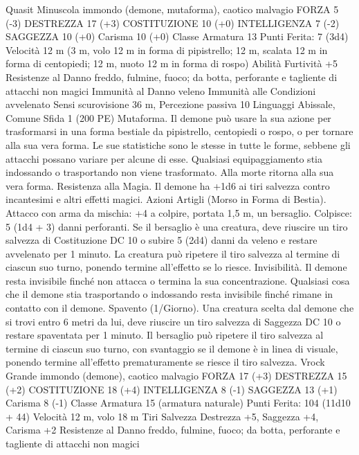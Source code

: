 \begin{multicols}{2}
Quasit
Minuscola immondo (demone, mutaforma), caotico malvagio
FORZA 5 (-3)
DESTREZZA 17 (+3)
COSTITUZIONE 10 (+0)
INTELLIGENZA 7 (-2)
SAGGEZZA 10 (+0)
Carisma 10 (+0)
Classe Armatura 13
\hspace*{0pt}\hfill{Punti Ferita}: 7 (3d4)
Velocità 12 m (3 m, volo 12 m in forma di pipistrello; 12 m,
scalata 12 m in forma di centopiedi; 12 m, nuoto 12 m in forma
di rospo)
Abilità Furtività +5
Resistenze al Danno freddo, fulmine, fuoco; da botta,
perforante e tagliente di attacchi non magici
Immunità al Danno veleno
Immunità alle Condizioni avvelenato
Sensi scurovisione 36 m, Percezione passiva 10
Linguaggi Abissale, Comune
Sfida 1 (200 PE)
Mutaforma. Il demone può usare la sua azione per trasformarsi
in una forma bestiale da pipistrello, centopiedi o rospo, o per
tornare alla sua vera forma. Le sue statistiche sono le stesse in
tutte le forme, sebbene gli attacchi possano variare per alcune di
esse. Qualsiasi equipaggiamento stia indossando o trasportando
non viene trasformato. Alla morte ritorna alla sua vera forma.
Resistenza alla Magia. Il demone ha +1d6 ai tiri salvezza
contro incantesimi e altri effetti magici.
Azioni
Artigli (Morso in Forma di Bestia). Attacco con arma da
mischia: +4 a colpire, portata 1,5 m, un bersaglio.
Colpisce: 5 (1d4 + 3) danni perforanti. Se il bersaglio è una
creatura, deve riuscire un tiro salvezza di Costituzione DC 10 o
subire 5 (2d4) danni da veleno e restare avvelenato per 1 minuto.
La creatura può ripetere il tiro salvezza al termine di ciascun suo
turno, ponendo termine all’effetto se lo riesce.
Invisibilità. Il demone resta invisibile finché non attacca o
termina la sua concentrazione. Qualsiasi cosa che il demone stia
trasportando o indossando resta invisibile finché rimane in
contatto con il demone.
Spavento (1/Giorno). Una creatura scelta dal demone che si trovi
entro 6 metri da lui, deve riuscire un tiro salvezza di Saggezza
DC 10 o restare spaventata per 1 minuto. Il bersaglio può ripetere
il tiro salvezza al termine di ciascun suo turno, con svantaggio se
il demone è in linea di visuale, ponendo termine all’effetto
prematuramente se riesce il tiro salvezza.
Vrock
Grande immondo (demone), caotico malvagio
FORZA 17 (+3)
DESTREZZA 15 (+2)
COSTITUZIONE 18 (+4)
INTELLIGENZA 8 (-1)
SAGGEZZA 13 (+1)
Carisma 8 (-1)
Classe Armatura 15 (armatura naturale)
\hspace*{0pt}\hfill{Punti Ferita}: 104 (11d10 + 44)
Velocità 12 m, volo 18 m
Tiri Salvezza Destrezza +5, Saggezza +4, Carisma +2
Resistenze al Danno freddo, fulmine, fuoco; da botta,
perforante e tagliente di attacchi non magici

\end{multicols}
